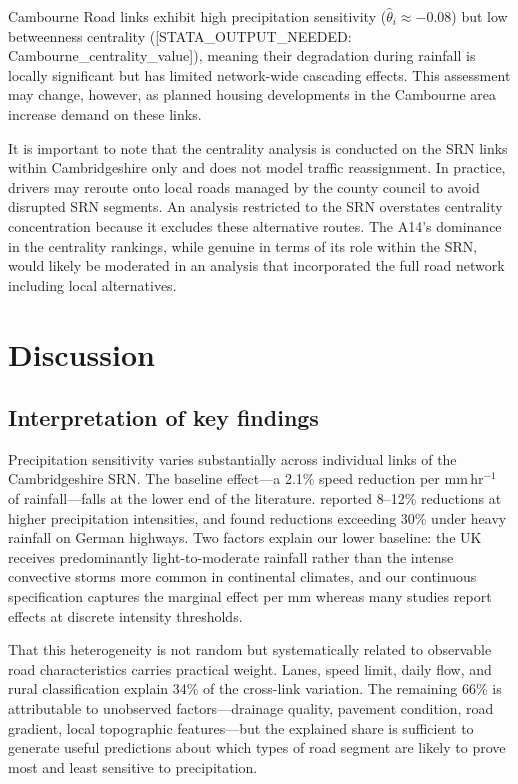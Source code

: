 \documentclass[review]{elsarticle}
\begin{document}
Cambourne Road links exhibit high precipitation sensitivity ($\hat{\theta}_i \approx -0.08$) but low betweenness centrality ([STATA\_OUTPUT\_NEEDED: Cambourne\_centrality\_value]), meaning their degradation during rainfall is locally significant but has limited network-wide cascading effects. This assessment may change, however, as planned housing developments in the Cambourne area increase demand on these links.

It is important to note that the centrality analysis is conducted on the SRN links within Cambridgeshire only and does not model traffic reassignment. In practice, drivers may reroute onto local roads managed by the county council to avoid disrupted SRN segments. An analysis restricted to the SRN overstates centrality concentration because it excludes these alternative routes. The A14's dominance in the centrality rankings, while genuine in terms of its role within the SRN, would likely be moderated in an analysis that incorporated the full road network including local alternatives.


\section{Discussion}
\label{sec:discussion}

\subsection{Interpretation of key findings}
\label{sec:disc:summary}

Precipitation sensitivity varies substantially across individual links of the Cambridgeshire SRN. The baseline effect---a 2.1\% speed reduction per mm\,hr$^{-1}$ of rainfall---falls at the lower end of the literature. \citet{hranac2006empirical} reported 8--12\% reductions at higher precipitation intensities, and \citet{becker2026rainfall} found reductions exceeding 30\% under heavy rainfall on German highways. Two factors explain our lower baseline: the UK receives predominantly light-to-moderate rainfall rather than the intense convective storms more common in continental climates, and our continuous specification captures the marginal effect per mm whereas many studies report effects at discrete intensity thresholds.

That this heterogeneity is not random but systematically related to observable road characteristics carries practical weight. Lanes, speed limit, daily flow, and rural classification explain 34\% of the cross-link variation. The remaining 66\% is attributable to unobserved factors---drainage quality, pavement condition, road gradient, local topographic features---but the explained share is sufficient to generate useful predictions about which types of road segment are likely to prove most and least sensitive to precipitation.
\end{document}
